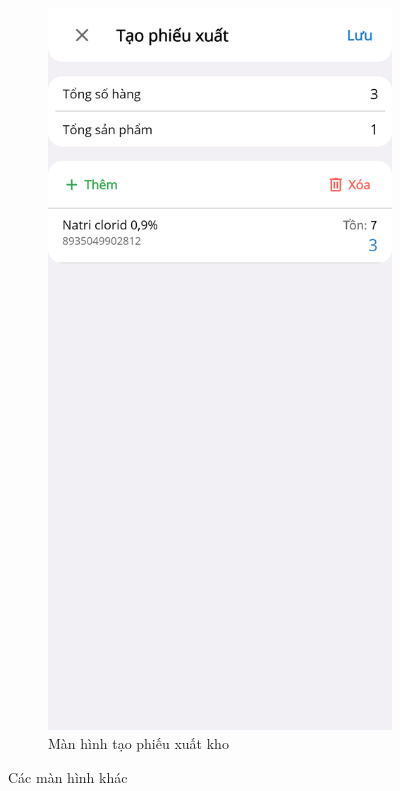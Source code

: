 \documentclass[../DoAn.tex]{subfiles}
\begin{document}
\begin{figure}[H]
    \begin{subfigure}{0.5\linewidth}
        \centering
        \includegraphics[width=0.9\linewidth]{Hinhve/design/screens/ExportReportCreatePage}
        \caption{Màn hình tạo phiếu xuất kho}
        \label{figure:screen-exportreportcreatepage}
    \end{subfigure}
    \caption{Các màn hình khác}
    \label{figure:screen-variouspages1}
\end{figure}
\break
\end{document}
